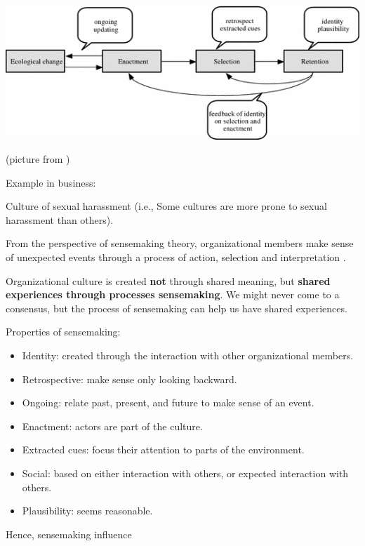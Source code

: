 \documentclass[
]{book}
\providecommand{\tightlist}{%
  \setlength{\itemsep}{0pt}\setlength{\parskip}{0pt}}
\begin{document}
\begin{center}\includegraphics[width=1\linewidth]{images/Sensemaking} \end{center}

(picture from \citep{Lu_2017})

Example in business: \citep{KennethWm_2014}

\citep{Dougherty_2004}

Culture of sexual harassment (i.e., Some cultures are more prone to sexual harassment than others).

From the perspective of sensemaking theory, organizational members make sense of unexpected events through a process of
action, selection and interpretation \citep{Weick_1995}.

Organizational culture is created \textbf{not} through shared meaning, but \textbf{shared experiences through processes
sensemaking}. We might never come to a consensus, but the process of sensemaking can help us have shared experiences.

Properties of sensemaking:

\begin{itemize}
\tightlist
\item
  Identity: created through the interaction with other organizational members.
\item
  Retrospective: make sense only looking backward.
\item
  Ongoing: relate past, present, and future to make sense of an event.
\item
  Enactment: actors are part of the culture.
\item
  Extracted cues: focus their attention to parts of the environment.
\item
  Social: based on either interaction with others, or expected interaction with others.
\item
  Plausibility: seems reasonable.
\end{itemize}

Hence, sensemaking influence
\end{document}
